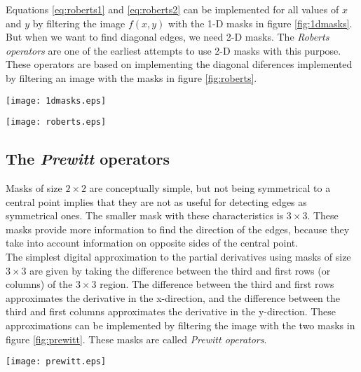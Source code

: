 \documentclass{ipol}
\numberwithin{equation}{section}
\numberwithin{table}{section}
\begin{document}
Equations \ref{eq:roberts1} and \ref{eq:roberts2} can be implemented for all values of $x$ and $y$
by filtering the image $f(x,y)$ with the 1-D masks in figure \ref{fig:1dmasks}. But when we want 
to find diagonal edges, we need 2-D masks. The \textit{Roberts operators} are one of the earliest 
attempts to use 2-D masks with this purpose. These operators are based on implementing the diagonal 
diferences implemented by filtering an image with the masks in figure \ref{fig:roberts}.\\

\begin{SCfigure}[3][!h]
	\centering
	\texttt{[image: 1dmasks.eps]}
	\caption{One-dimensional masks used to implement equations \ref{eq:roberts1} and \ref{eq:roberts2}.}
	\label{fig:1dmasks}
\end{SCfigure}

\begin{SCfigure}[3][!h]
	\centering
	\texttt{[image: roberts.eps]}
	\caption{\textit{Roberts cross-gradient} 2-D masks.}
	\label{fig:roberts}
\end{SCfigure}

\subsection{The \textit{Prewitt} operators}

Masks of size $2\times2$ are conceptually simple, but not being symmetrical to a central point implies 
that they are not as useful for detecting edges as symmetrical ones. The smaller mask with these characteristics is 
$3\times3$. These masks provide more information to find the direction of the edges, because they take 
into account information on opposite sides of the central point.\\

The simplest digital approximation to the partial derivatives using masks of size $3\times3$ are given 
by taking the difference between the third and first rows (or columns) of the $3\times3$ region. The
difference between the third and first rows approximates the derivative in the x-direction, and 
the difference between the third and first columns approximates the derivative in the y-direction.
These approximations can be implemented by filtering the image with the two masks in figure \ref{fig:prewitt}.
These masks are called \textit{Prewitt operators}.\\

\begin{SCfigure}[2][!h]
	\centering
	\texttt{[image: prewitt.eps]}
	\caption{\textit{Prewitt} 2-D masks of size $3\times3$.}
	\label{fig:prewitt}
\end{SCfigure}
\end{document}
